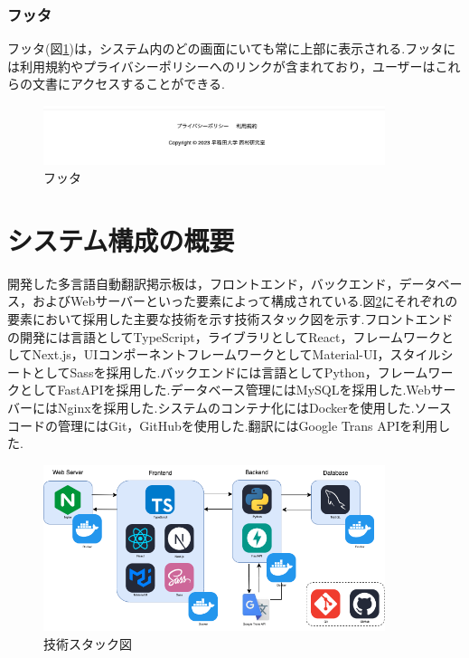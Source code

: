 \documentclass[b5paper,12pt,dvipdfmx]{jsreport}
\begin{document}

\subsubsection{フッタ}
フッタ(図\ref{fig:footer})は，システム内のどの画面にいても常に上部に表示される.フッタには利用規約やプライバシーポリシーへのリンクが含まれており，ユーザーはこれらの文書にアクセスすることができる.

\begin{figure}[H]
	\centering
    \includegraphics[width=100mm,height=17.33mm]{./img/feature/footer.png}
	\caption{フッタ}
	\label{fig:footer}
\end{figure}


\section{システム構成の概要}
開発した多言語自動翻訳掲示板は，フロントエンド，バックエンド，データベース，およびWebサーバーといった要素によって構成されている.図\ref{fig:tech_stack}にそれぞれの要素において採用した主要な技術を示す技術スタック図を示す.フロントエンドの開発には言語としてTypeScript，ライブラリとしてReact，フレームワークとしてNext.js，UIコンポーネントフレームワークとしてMaterial-UI，スタイルシートとしてSassを採用した.バックエンドには言語としてPython，フレームワークとしてFastAPIを採用した.データベース管理にはMySQLを採用した.WebサーバーにはNginxを採用した.システムのコンテナ化にはDockerを使用した.ソースコードの管理にはGit，GitHubを使用した.翻訳にはGoogle Trans APIを利用した.

\begin{figure}[H]
	\centering
    \includegraphics[width=100mm,height=48.58mm]{./img/system/technology_stack.png}
	\caption{技術スタック図}
	\label{fig:tech_stack}
\end{figure}
\end{document}

